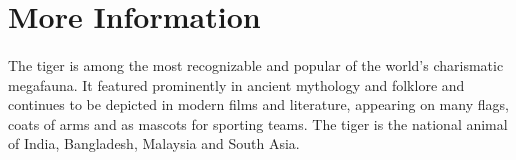 \documentclass[12pt]{article}
\begin{document}
	\pagebreak
	\section{More Information}
	\paragraph{}
	The tiger is among the most recognizable and popular of the world's charismatic megafauna. It featured prominently in ancient mythology and folklore and continues to be depicted in modern films and literature, appearing on many flags, coats of arms and as mascots for sporting teams. The tiger is the national animal of India, Bangladesh, Malaysia and South Asia.
	
	
	
	\printindex %
	
\end{document}

